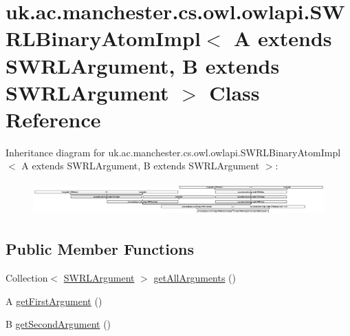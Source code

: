 \hypertarget{classuk_1_1ac_1_1manchester_1_1cs_1_1owl_1_1owlapi_1_1_s_w_r_l_binary_atom_impl_3_01_a_01extends733cb0b232fc39d6f31ee5b88a06cbcc}{\section{uk.\-ac.\-manchester.\-cs.\-owl.\-owlapi.\-S\-W\-R\-L\-Binary\-Atom\-Impl$<$ A extends S\-W\-R\-L\-Argument, B extends S\-W\-R\-L\-Argument $>$ Class Reference}
\label{classuk_1_1ac_1_1manchester_1_1cs_1_1owl_1_1owlapi_1_1_s_w_r_l_binary_atom_impl_3_01_a_01extends733cb0b232fc39d6f31ee5b88a06cbcc}
}
Inheritance diagram for uk.\-ac.\-manchester.\-cs.\-owl.\-owlapi.\-S\-W\-R\-L\-Binary\-Atom\-Impl$<$ A extends S\-W\-R\-L\-Argument, B extends S\-W\-R\-L\-Argument $>$\-:\begin{figure}[H]
\begin{center}
\leavevmode
\includegraphics[height=1.278539cm]{classuk_1_1ac_1_1manchester_1_1cs_1_1owl_1_1owlapi_1_1_s_w_r_l_binary_atom_impl_3_01_a_01extends733cb0b232fc39d6f31ee5b88a06cbcc}
\end{center}
\end{figure}
\subsection*{Public Member Functions}
\begin{DoxyCompactItemize}
\item 
Collection$<$ \hyperlink{interfaceorg_1_1semanticweb_1_1owlapi_1_1model_1_1_s_w_r_l_argument}{S\-W\-R\-L\-Argument} $>$ \hyperlink{classuk_1_1ac_1_1manchester_1_1cs_1_1owl_1_1owlapi_1_1_s_w_r_l_binary_atom_impl_3_01_a_01extends733cb0b232fc39d6f31ee5b88a06cbcc_a331741ef4cffaed324b521cbd34e34f8}{get\-All\-Arguments} ()
\item 
A \hyperlink{classuk_1_1ac_1_1manchester_1_1cs_1_1owl_1_1owlapi_1_1_s_w_r_l_binary_atom_impl_3_01_a_01extends733cb0b232fc39d6f31ee5b88a06cbcc_a221c344ed7b32093cf51bf2e52b150b9}{get\-First\-Argument} ()
\item 
B \hyperlink{classuk_1_1ac_1_1manchester_1_1cs_1_1owl_1_1owlapi_1_1_s_w_r_l_binary_atom_impl_3_01_a_01extends733cb0b232fc39d6f31ee5b88a06cbcc_ad1d04f908ae3186e6fe9b4d8dd2d160b}{get\-Second\-Argument} ()
\end{DoxyCompactItemize}
